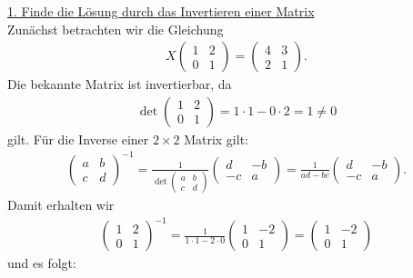\underline{1. Finde die Lösung durch das Invertieren einer Matrix}\\
Zunächst betrachten wir die Gleichung
\begin{align*}
X
\begin{pmatrix}
1 & 2 \\
0 & 1 
\end{pmatrix}
=
\begin{pmatrix}
4 & 3 \\
2 & 1
\end{pmatrix}
.
\end{align*}
Die bekannte Matrix ist invertierbar, da
\begin{align*}
\det \begin{pmatrix}
1 & 2 \\
0 & 1 
\end{pmatrix}
= 1 \cdot 1 - 0 \cdot 2 = 1 \neq 0
\end{align*}
gilt.
Für die Inverse einer $ 2 \times 2 $  Matrix gilt:
\begin{align*}
\begin{pmatrix}
a & b \\
c & d
\end{pmatrix}^{-1}
= 
\frac{1}{\det \begin{pmatrix}
	a & b \\
	c & d
	\end{pmatrix}}
\begin{pmatrix}
d & -b \\
-c & a
\end{pmatrix}
= \frac{1}{a d - bc} 
\begin{pmatrix}
d & -b \\
-c & a
\end{pmatrix}.
\end{align*}
Damit erhalten wir 
\begin{align*}
\begin{pmatrix}
1 & 2 \\
0 & 1 
\end{pmatrix}^{-1}
=
\frac{1}{1 \cdot 1 - 2 \cdot 0}
\begin{pmatrix}
1 & -2 \\
0 & 1 
\end{pmatrix}
= \begin{pmatrix}
1 & -2\\
0 & 1
\end{pmatrix}
\end{align*}
und es folgt:
